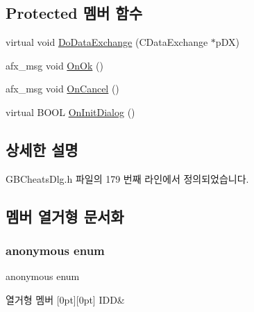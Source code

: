 \subsection*{Protected 멤버 함수}
\begin{DoxyCompactItemize}
\item 
virtual void \mbox{\hyperlink{class_add_g_b_code_a7ae9f69b6acec1cb7816dc4959ba0b1c}{Do\+Data\+Exchange}} (C\+Data\+Exchange $\ast$p\+DX)
\item 
afx\+\_\+msg void \mbox{\hyperlink{class_add_g_b_code_ad6bdbbb8375531b30329c5ab4689c052}{On\+Ok}} ()
\item 
afx\+\_\+msg void \mbox{\hyperlink{class_add_g_b_code_a0ebf90bce5407457b60eb77237adec17}{On\+Cancel}} ()
\item 
virtual B\+O\+OL \mbox{\hyperlink{class_add_g_b_code_a1f7ec5a04ded3dee0016552b0961ffba}{On\+Init\+Dialog}} ()
\end{DoxyCompactItemize}


\subsection{상세한 설명}


G\+B\+Cheats\+Dlg.\+h 파일의 179 번째 라인에서 정의되었습니다.



\subsection{멤버 열거형 문서화}
\mbox{\label{class_add_g_b_code_a2dd2d84fa89620e9d1bd9816ac698df9}} 
\subsubsection{\texorpdfstring{anonymous enum}{anonymous enum}}
{\footnotesize\ttfamily anonymous enum}

\begin{DoxyEnumFields}{열거형 멤버}
[0pt][0pt]{}\mbox{\label{class_add_g_b_code_a2dd2d84fa89620e9d1bd9816ac698df9a796ce5251d56e030eaec4941c10b6a17}} 
I\+DD&\\
\hline

\end{DoxyEnumFields}


